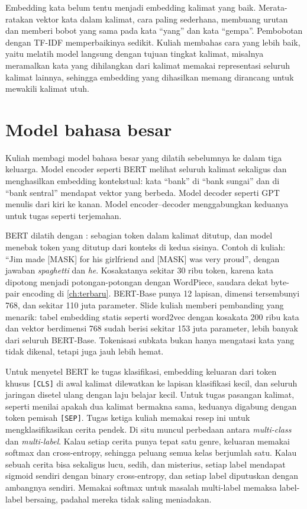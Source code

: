 Embedding kata belum tentu menjadi embedding kalimat yang baik. Merata-ratakan vektor kata dalam kalimat, cara paling sederhana,
membuang urutan dan memberi bobot yang sama pada kata ``yang'' dan kata ``gempa''. Pembobotan dengan TF-IDF memperbaikinya sedikit.
Kuliah membahas cara yang lebih baik, yaitu melatih model langsung dengan tujuan tingkat kalimat, misalnya meramalkan kata yang
dihilangkan dari kalimat memakai representasi seluruh kalimat lainnya, sehingga embedding yang dihasilkan memang dirancang untuk
mewakili kalimat utuh.

\section{Model bahasa besar}

Kuliah membagi model bahasa besar yang dilatih sebelumnya ke dalam tiga keluarga. Model encoder seperti BERT \citep{devlin2019}
melihat seluruh kalimat sekaligus dan menghasilkan embedding kontekstual: kata ``bank'' di ``bank sungai'' dan di ``bank sentral''
mendapat vektor yang berbeda. Model decoder seperti GPT \citep{brown2020} menulis dari kiri ke kanan. Model encoder--decoder
menggabungkan keduanya untuk tugas seperti terjemahan.

BERT dilatih dengan : sebagian token dalam kalimat ditutup, dan model menebak token yang ditutup dari
konteks di kedua sisinya. Contoh di kuliah: ``Jim made [MASK] for his girlfriend and [MASK] was very proud'', dengan jawaban
\emph{spaghetti} dan \emph{he}. Kosakatanya sekitar 30 ribu token, karena kata dipotong menjadi potongan-potongan dengan WordPiece,
saudara dekat byte-pair encoding di \cref{ch:terbaru}. BERT-Base punya 12 lapisan, dimensi tersembunyi 768, dan sekitar 110 juta
parameter. Slide kuliah memberi pembanding yang menarik: tabel embedding statis seperti word2vec dengan kosakata 200 ribu kata dan
vektor berdimensi 768 sudah berisi sekitar 153 juta parameter, lebih banyak dari seluruh BERT-Base. Tokenisasi subkata bukan hanya
mengatasi kata yang tidak dikenal, tetapi juga jauh lebih hemat.

Untuk menyetel BERT ke tugas klasifikasi, embedding keluaran dari token khusus \texttt{[CLS]} di awal kalimat dilewatkan ke lapisan
klasifikasi kecil, dan seluruh jaringan disetel ulang dengan laju belajar kecil. Untuk tugas pasangan kalimat, seperti menilai
apakah dua kalimat bermakna sama, keduanya digabung dengan token pemisah \texttt{[SEP]}. Tugas ketiga kuliah memakai resep ini untuk
mengklasifikasikan cerita pendek. Di situ muncul perbedaan antara \emph{multi-class} dan \emph{multi-label}. Kalau setiap cerita
punya tepat satu genre, keluaran memakai softmax dan cross-entropy, sehingga peluang semua kelas berjumlah satu. Kalau sebuah cerita
bisa sekaligus lucu, sedih, dan misterius, setiap label mendapat sigmoid sendiri dengan binary cross-entropy, dan setiap label
diputuskan dengan ambangnya sendiri. Memakai softmax untuk masalah multi-label memaksa label-label bersaing, padahal mereka tidak
saling meniadakan.

